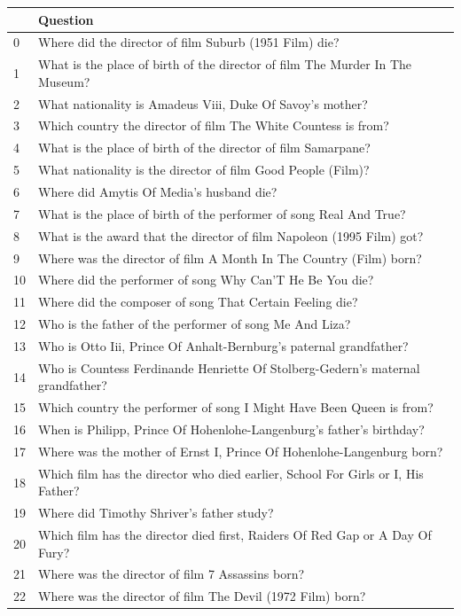 \begin{tabular}{ll}
\toprule
 & Question \\
\midrule
0 & Where did the director of film Suburb (1951 Film) die? \\
1 & What is the place of birth of the director of film The Murder In The Museum? \\
2 & What nationality is Amadeus Viii, Duke Of Savoy's mother? \\
3 & Which country the director of film The White Countess is from? \\
4 & What is the place of birth of the director of film Samarpane? \\
5 & What nationality is the director of film Good People (Film)? \\
6 & Where did Amytis Of Media's husband die? \\
7 & What is the place of birth of the performer of song Real And True? \\
8 & What is the award that the director of film Napoleon (1995 Film) got? \\
9 & Where was the director of film A Month In The Country (Film) born? \\
10 & Where did the performer of song Why Can'T He Be You die? \\
11 & Where did the composer of song That Certain Feeling die? \\
12 & Who is the father of the performer of song Me And Liza? \\
13 & Who is Otto Iii, Prince Of Anhalt-Bernburg's paternal grandfather? \\
14 & Who is Countess Ferdinande Henriette Of Stolberg-Gedern's maternal grandfather? \\
15 & Which country the performer of song I Might Have Been Queen is from? \\
16 & When is Philipp, Prince Of Hohenlohe-Langenburg's father's birthday? \\
17 & Where was the mother of Ernst I, Prince Of Hohenlohe-Langenburg born? \\
18 & Which film has the director who died earlier, School For Girls or I, His Father? \\
19 & Where did Timothy Shriver's father study? \\
20 & Which film has the director died first, Raiders Of Red Gap or A Day Of Fury? \\
21 & Where was the director of film 7 Assassins born? \\
22 & Where was the director of film The Devil (1972 Film) born? \\

\end{tabular}
